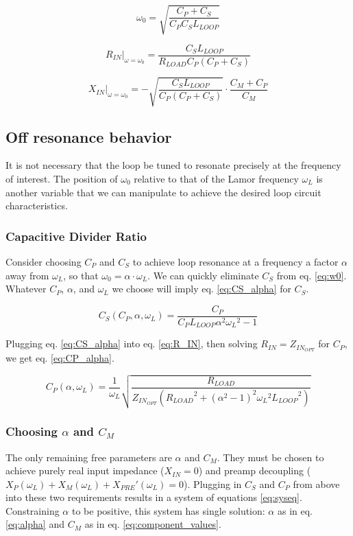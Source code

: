 \begin{equation} \label{eq:w0}
    \omega_0 = \sqrt{\frac{C_P+C_S}{C_P C_S L_{LOOP}}}
\end{equation}

\begin{equation} \label{eq:R_IN_RES}
    R_{IN}\big|_{\omega=\omega_0}= \frac{C_S L_{LOOP}}{R_{LOAD} C_P (C_P + C_S)}
\end{equation}

\begin{equation} \label{eq:X_IN_RES}
    X_{IN}\big|_{\omega=\omega_0}=-\sqrt{\frac{C_S L_{LOOP}}{C_P (C_P + C_S)}} \cdot \frac{C_M + C_P}{C_M}
\end{equation}

\subsection{Off resonance behavior}
It is not necessary that the loop be tuned to resonate precisely at the frequency of interest. The position of
$\omega_0$ relative to that of the Lamor frequency $\omega_L$ is another variable that we can manipulate to achieve the
desired loop circuit characteristics.

\subsubsection{Capacitive Divider Ratio}
Consider choosing $C_P$ and $C_S$ to achieve loop resonance at a frequency a factor $\alpha$ away from $\omega_L$, so
that $\omega_0 = \alpha\cdot\omega_L$. We can quickly eliminate $C_S$ from eq. \ref{eq:w0}. Whatever $C_P$, $\alpha$, and
$\omega_L$ we choose will imply eq. \ref{eq:CS_alpha} for $C_S$.

\begin{equation} \label{eq:CS_alpha}
    C_S(C_P,\alpha,\omega_L) = \frac{C_P}{C_P L_{LOOP} \alpha^2 {\omega_L}^2 -1}
\end{equation}

Plugging eq. \ref{eq:CS_alpha} into eq. \ref{eq:R_IN}, then solving $R_{IN} = Z_{IN_{OPT}}$ for $C_P$, we get eq.
\ref{eq:CP_alpha}.

\begin{equation} \label{eq:CP_alpha}
    C_P(\alpha,\omega_L) = \frac{1}{\omega_L}\sqrt{\frac{R_{LOAD}}{Z_{IN_{OPT}} ( {R_{LOAD}}^2 + (\alpha^2-1)^2 {\omega_L}^2
    {L_{LOOP}}^2)}}
\end{equation}

\subsubsection{Choosing $\alpha$ and $C_M$}
The only remaining free parameters are $\alpha$ and $C_M$.  They must be chosen to achieve purely real input impedance
($X_{IN} = 0$) and preamp decoupling ($X_P(\omega_L) + X_M(\omega_L) +{X_{PRE}}'(\omega_L) = 0$). Plugging in $C_S$ and
$C_P$ from above into these two requirements results in a system of equations \ref{eq:syseq}. Constraining $\alpha$ to
be positive, this system has single solution: $\alpha$ as in eq. \ref{eq:alpha} and $C_M$ as in eq.
\ref{eq:component_values}.

